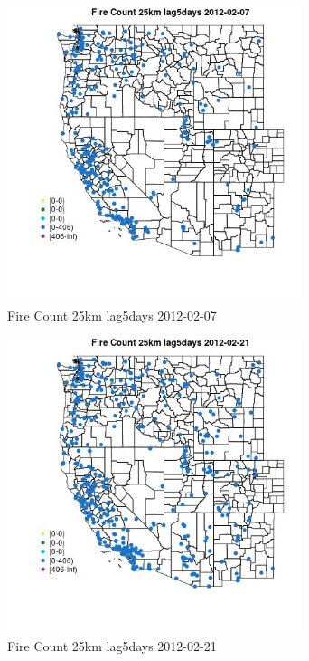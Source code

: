 \begin{figure} 
\centering  
\includegraphics[width=0.77\textwidth]{Code_Outputs/Report_ML_input_PM25_Step4_part_f_de_duplicated_aves_prioritize_24hr_obswNAs_MapObsFire_Count_25km_lag5days2012-02-07.jpg} 
\caption{\label{fig:Report_ML_input_PM25_Step4_part_f_de_duplicated_aves_prioritize_24hr_obswNAsMapObsFire_Count_25km_lag5days2012-02-07}Fire Count 25km lag5days 2012-02-07} 
\end{figure} 
 

\begin{figure} 
\centering  
\includegraphics[width=0.77\textwidth]{Code_Outputs/Report_ML_input_PM25_Step4_part_f_de_duplicated_aves_prioritize_24hr_obswNAs_MapObsFire_Count_25km_lag5days2012-02-21.jpg} 
\caption{\label{fig:Report_ML_input_PM25_Step4_part_f_de_duplicated_aves_prioritize_24hr_obswNAsMapObsFire_Count_25km_lag5days2012-02-21}Fire Count 25km lag5days 2012-02-21} 
\end{figure} 
 

